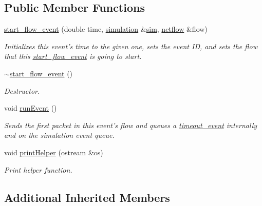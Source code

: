 \subsection*{Public Member Functions}
\begin{DoxyCompactItemize}
\item 
\hypertarget{classstart__flow__event_a90655a3096c3f9112e95cc725582dcca}{\hyperlink{classstart__flow__event_a90655a3096c3f9112e95cc725582dcca}{start\-\_\-flow\-\_\-event} (double time, \hyperlink{classsimulation}{simulation} \&\hyperlink{classevent_a08c6d828bfb6f5539dcd1491e8ac77d2}{sim}, \hyperlink{classnetflow}{netflow} \&flow)}\label{classstart__flow__event_a90655a3096c3f9112e95cc725582dcca}

\begin{DoxyCompactList}\small\item\em Initializes this event's time to the given one, sets the event I\-D, and sets the flow that this \hyperlink{classstart__flow__event}{start\-\_\-flow\-\_\-event} is going to start. \end{DoxyCompactList}\item 
\hyperlink{classstart__flow__event_ad2892a0ae75b1438cd3bfa7839a21be1}{$\sim$start\-\_\-flow\-\_\-event} ()
\begin{DoxyCompactList}\small\item\em Destructor. \end{DoxyCompactList}\item 
\hypertarget{classstart__flow__event_a91f8f55565468bc294d89ccba846f759}{void \hyperlink{classstart__flow__event_a91f8f55565468bc294d89ccba846f759}{run\-Event} ()}\label{classstart__flow__event_a91f8f55565468bc294d89ccba846f759}

\begin{DoxyCompactList}\small\item\em Sends the first packet in this event's flow and queues a \hyperlink{classtimeout__event}{timeout\-\_\-event} internally and on the simulation event queue. \end{DoxyCompactList}\item 
void \hyperlink{classstart__flow__event_a75f4d4c3599f5ebc7813caccf07cde54}{print\-Helper} (ostream \&os)
\begin{DoxyCompactList}\small\item\em Print helper function. \end{DoxyCompactList}\end{DoxyCompactItemize}
\subsection*{Additional Inherited Members}


